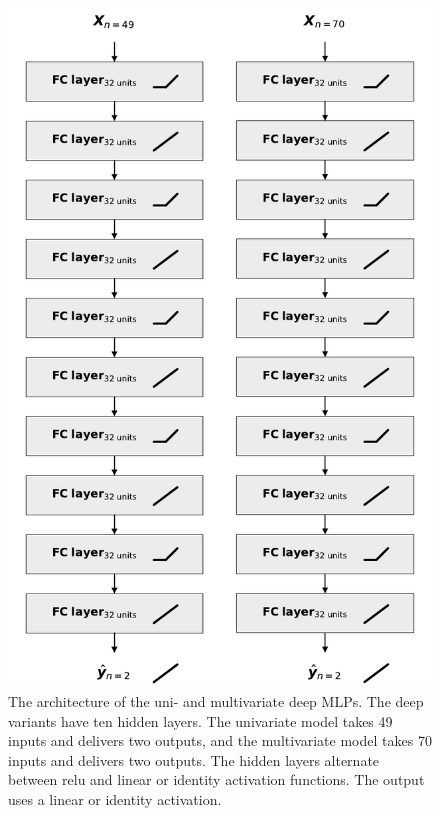 \documentclass[mstat,12pt]{unswthesis}
\begin{document}
\begin{figure}[H]
\centerline{\includegraphics[width=0.9\columnwidth]{Figures/Diagrams/MLP deep.pdf}}
\caption{The architecture of the uni- and multivariate deep MLPs. The deep variants have ten hidden layers. The univariate model takes 49 inputs and delivers two outputs, and the multivariate model takes 70 inputs and delivers two outputs. The hidden layers alternate between relu and linear or identity activation functions. The output uses a linear or identity activation.}
\label{mlp_deep}
\end{figure}
\end{document}
